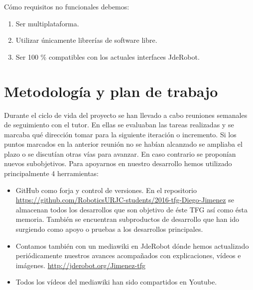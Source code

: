 Cómo requisitos no funcionales debemos:

\begin{enumerate}
\item Ser multiplataforma.
\item Utilizar únicamente librerías de software libre.
\item Ser 100 \% compatibles con los actuales interfaces JdeRobot.
\end{enumerate}

\section{Metodología y plan de trabajo}

Durante el ciclo de vida del proyecto se han llevado a cabo reuniones semanales de seguimiento con el tutor. En ellas se evaluaban las tareas realizadas y se marcaba qué dirección tomar para la siguiente iteración o incremento. Si los puntos marcados en la anterior reunión no se habían alcanzado se ampliaba el plazo o se discutían otras vías para avanzar. En caso contrario se proponían nuevos subobjetivos.
Para apoyarnos en nuestro desarrollo hemos utilizado principalmente 4 herramientas:
\begin{itemize}
\item GitHub como forja y control de versiones. En el repositorio \url{https://github.com/RoboticsURJC-students/2016-tfg-Diego-Jimenez}
se almacenan todos los desarrollos que son objetivo de éste TFG así como ésta memoria. También se encuentran subproductos de desarrollo que han ido surgiendo como apoyo o pruebas a los desarrollos principales.
\item Contamos también con un mediawiki en JdeRobot dónde hemos actualizado periódicamente nuestros avances acompañados con explicaciones, vídeos e imágenes. \url{http://jderobot.org/Jimenez-tfg}
\item Todos los vídeos del mediawiki han sido compartidos en Youtube.
\end{itemize}


